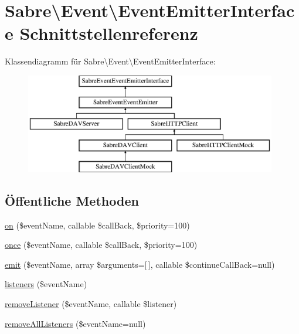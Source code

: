 \hypertarget{interface_sabre_1_1_event_1_1_event_emitter_interface}{}\section{Sabre\textbackslash{}Event\textbackslash{}Event\+Emitter\+Interface Schnittstellenreferenz}
\label{interface_sabre_1_1_event_1_1_event_emitter_interface}
Klassendiagramm für Sabre\textbackslash{}Event\textbackslash{}Event\+Emitter\+Interface\+:\begin{figure}[H]
\begin{center}
\leavevmode
\includegraphics[height=4.361371cm]{interface_sabre_1_1_event_1_1_event_emitter_interface}
\end{center}
\end{figure}
\subsection*{Öffentliche Methoden}
\begin{DoxyCompactItemize}
\item 
\mbox{\hyperlink{interface_sabre_1_1_event_1_1_event_emitter_interface_a53f550e464cd72da9d34bda91b21019e}{on}} (\$event\+Name, callable \$call\+Back, \$priority=100)
\item 
\mbox{\hyperlink{interface_sabre_1_1_event_1_1_event_emitter_interface_a99dae4b6fef528fa2f8c131d44139dec}{once}} (\$event\+Name, callable \$call\+Back, \$priority=100)
\item 
\mbox{\hyperlink{interface_sabre_1_1_event_1_1_event_emitter_interface_a1de715b914e779a2944b8980490ed242}{emit}} (\$event\+Name, array \$arguments=\mbox{[}$\,$\mbox{]}, callable \$continue\+Call\+Back=null)
\item 
\mbox{\hyperlink{interface_sabre_1_1_event_1_1_event_emitter_interface_a8e973625ec94c936744c77293c5203fa}{listeners}} (\$event\+Name)
\item 
\mbox{\hyperlink{interface_sabre_1_1_event_1_1_event_emitter_interface_a4cce62eaf6e5359058bb091eade127aa}{remove\+Listener}} (\$event\+Name, callable \$listener)
\item 
\mbox{\hyperlink{interface_sabre_1_1_event_1_1_event_emitter_interface_a12f97185d78b53acc328adcd6f1681c9}{remove\+All\+Listeners}} (\$event\+Name=null)
\end{DoxyCompactItemize}



